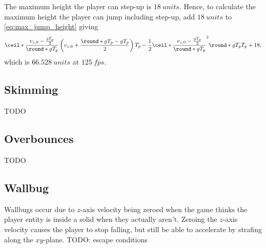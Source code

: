The maximum height the player can step-up is $\qty{18}{units}$.
Hence, to calculate the maximum height the player can jump including step-up, add $\qty{18}{units}$ to \eqref{eq:max_jump_height} giving
\begin{align}
\label{eq:max_jump_height_stepup}
\ceil*{\frac{v_{z,0} - \frac{gT_p}{2}}{\round*{gT_p}}}\left(v_{z,0} + \frac{\round*{gT_p} - gT_p}{2} \right) T_p - \frac{1}{2}\ceil*{\frac{v_{z,0} - \frac{gT_p}{2}}{\round*{gT_p}}}^2 \round*{gT_p} T_p + 18,
\end{align}
which is $\qty{66.528}{units}$ at $\qty{125}{fps}$.


\subsection{Skimming}
\label{sec:skimming}
TODO


\subsection{Overbounces}
\label{sec:overbounce}
TODO%


\subsection{Wallbug}
\label{sec:wallbug}
Wallbugs occur due to $z$-axis velocity being zeroed when the game thinks the player entity is inside a solid when they actually aren't.
Zeroing the $z$-axis velocity causes the player to stop falling, but still be able to accelerate by strafing along the $xy$-plane.
TODO: escape conditions
